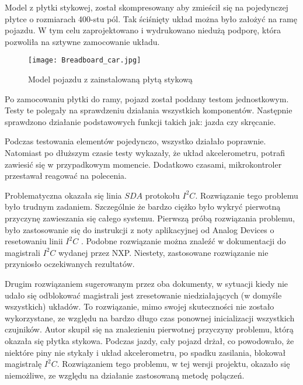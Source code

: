         Model z płytki stykowej, został skompresowany aby zmieścił się na pojedynczej płytce o rozmiarach 400-stu pól.
        Tak ściśnięty układ można było założyć na ramę pojazdu.
        W tym celu zaprojektowano i wydrukowano niedużą podporę, która pozwoliła na sztywne zamocowanie układu.

        \begin{figure}[!ht]
            \centering
            \texttt{[image: Breadboard\_car.jpg]}
            \caption{Model pojazdu z zainstalowaną płytą stykową}
            \label{fig:breadboard_car}
        \end{figure}

        Po zamocowaniu płytki do ramy, pojazd został poddany testom jednostkowym.
        Testy te polegały na sprawdzeniu działania wszystkich komponentów.
        Następnie sprawdzono działanie podstawowych funkcji takich jak: jazda czy skręcanie.

        Podczas testowania elementów pojedynczo, wszystko działało poprawnie.
        Natomiast po dłuższym czasie testy wykazały, że układ akcelerometru, potrafi zawiesić się w przypadkowym momencie.
        Dodatkowo czasami, mikrokontroler przestawał reagować na polecenia.

        Problematyczna okazała się linia $SDA$ protokołu $I^2C$.
        Rozwiązanie tego problemu było trudnym zadaniem.
        Szczególnie że bardzo ciężko było wykryć pierwotną przyczynę zawieszania się całego systemu.
        Pierwszą próbą rozwiązania problemu, było zastosowanie się do instrukcji z noty aplikacyjnej od Analog Devices o resetowaniu linii $I^2C$ \cite{application_note_I2C_AD}.
        Podobne rozwiązanie można znaleźć w dokumentacji do magistrali $I^2C$ \cite{I2C_manual_NXP} wydanej przez NXP.
        Niestety, zastosowane rozwiązanie nie przyniosło oczekiwanych rezultatów.

        Drugim rozwiązaniem sugerowanym przez oba dokumenty, w sytuacji kiedy nie udało się odblokować magistrali jest zresetowanie niedziałających (w domyśle wszystkich) układów.
        To rozwiązanie, mimo swojej skuteczności nie zostało wykorzystane, ze względu na bardzo długo czas ponownej inicializacji wszystkich czujników.
        Autor skupił się na znalezieniu pierwotnej przyczyny problemu, którą okazała się płytka stykowa.
        Podczas jazdy, cały pojazd drżał, co powodowało, że niektóre piny nie stykały i układ akcelerometru, po spadku zasilania, blokował magistralę $I^2C$.
        Rozwiązaniem tego problemu, w tej wersji projektu, okazało się niemożliwe, ze względu na działanie zastosowaną metodę połączeń.

